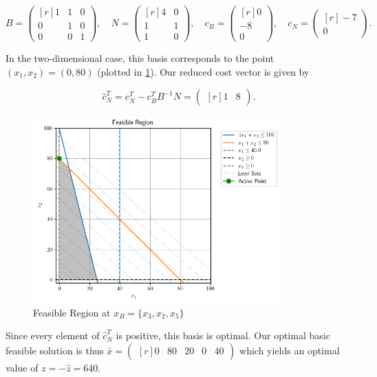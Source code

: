 \begin{solution}
  $$
    B = \begin{pmatrix*}[r]
      1 & 1 & 0 \\
      0 & 1 & 0 \\
      0 & 0 & 1
    \end{pmatrix*}, \quad N = \begin{pmatrix*}[r]
      4 & 0 \\
      1 & 1 \\
      1 & 0
    \end{pmatrix*}, \quad c_B = \begin{pmatrix*}[r]
      0 \\
     -8 \\
      0
    \end{pmatrix*}, \quad c_N = \begin{pmatrix*}[r]
     -7  \\
      0
    \end{pmatrix*}.
  $$

  In the two-dimensional case, this basis corresponds to the point $(x_1, x_2) = (0, 80)$ (plotted in 
  \ref{fig:problem_1v_iteration_2}). Our reduced cost vector is given by 

  $$
  \hat{c}_N^T = c_N^T - c_B^T B^{-1} N = \begin{pmatrix*}[r]
     1 & 8
  \end{pmatrix*}.
  $$

  \begin{figure}[h]
    \centering
    \includegraphics*[width=0.85\textwidth]{problem_1v_2.png}
    \caption{Feasible Region at $x_B = \{x_3, x_2, x_5 \}$}
    \label{fig:problem_1v_iteration_2}
  \end{figure}
 
  \pagebreak
  Since every element of $\hat{c}_N^T$ is positive, this basis is optimal. Our optimal basic feasible solution is thus
  $\bar{x} = \begin{pmatrix*}[r]
    0 & 80 & 20 & 0 & 40
  \end{pmatrix*}$ which yields an optimal value of $z = -\hat{z} = 640$.
  \ \\
\end{solution}